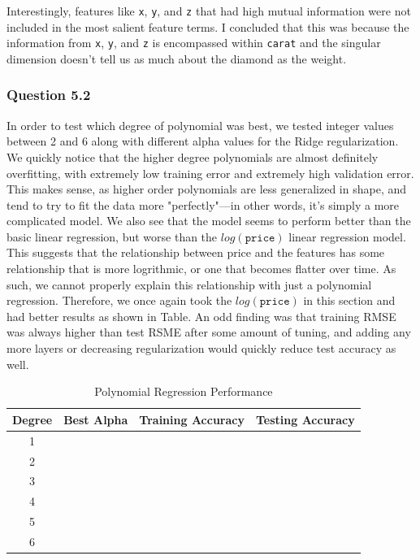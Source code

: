 \documentclass[11pt,letterpaper]{article}
\begin{document}
Interestingly, features like \texttt{x}, \texttt{y}, and \texttt{z} that had high mutual information 
were not included in the most salient feature terms. I concluded that this was because 
the information from \texttt{x}, \texttt{y}, and \texttt{z} is encompassed within 
\texttt{carat} and the singular dimension doesn't tell us as much about the diamond 
as the weight. 


\subsubsection*{Question 5.2}
In order to test which degree of polynomial was best, we tested integer values between 2 and 6 along with 
different alpha values for the Ridge regularization. We quickly notice that the higher degree polynomials 
are almost definitely overfitting, with extremely low training error and extremely high validation error.
This makes sense, as higher order polynomials are less generalized in shape, and tend to try to fit the data 
more "perfectly"—in other words, it's simply a more complicated model. We also see that the 
model seems to perform better than the basic linear regression, but worse than the $log(\texttt{price})$ 
linear regression model. This suggests that the relationship between price and the features has 
some relationship that is more logrithmic, or one that becomes flatter over time. As such, we cannot 
properly explain this relationship with just a polynomial regression. Therefore, we once again 
took the $log(\texttt{price})$ in this section and had better results as shown in Table. An 
odd finding was that training RMSE was always higher than test RSME after some amount 
of tuning, and adding any more layers or decreasing regularization would quickly reduce 
test accuracy as well. 

\begin{table}[ht]
    \centering
        \label{table1} 
        \begin{tabular}{ccll} 
        \hline
        Degree & Best Alpha & Training Accuracy & Testing Accuracy \\
        \hline 
        1 & \\
        2 & \\
        3 & \\
        4 & \\
        5 & \\
        6 &
        \end{tabular}
        \caption{Polynomial Regression Performance}
        \end{table}
\end{document}

